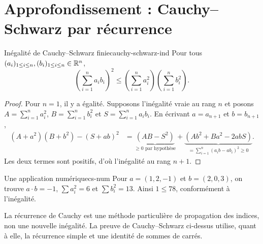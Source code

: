 \section{Approfondissement : Cauchy--Schwarz par récurrence}
\begin{theoreme}{Inégalité de Cauchy--Schwarz finie}{cauchy-schwarz-ind}
Pour tous $(a_i)_{1\le i\le n},(b_i)_{1\le i\le n}\in\mathbb R^n$,
\[
 \left(\sum_{i=1}^n a_ib_i\right)^2\le
 \left(\sum_{i=1}^n a_i^2\right)
 \left(\sum_{i=1}^n b_i^2\right).
\]
\end{theoreme}
\begin{proof}
Pour $n=1$, il y a égalité. Supposons l'inégalité vraie au rang $n$
et posons $A=\sum_{i=1}^n a_i^2$, $B=\sum_{i=1}^n b_i^2$ et
$S=\sum_{i=1}^n a_ib_i$. En écrivant $a=a_{n+1}$ et $b=b_{n+1}$,
\[
\begin{aligned}
 (A+a^2)(B+b^2)-(S+ab)^2
 &=\underbrace{(AB-S^2)}_{\ge0\text{ par hypothèse}}+
   \underbrace{(Ab^2+Ba^2-2abS)}_{=\sum_{i=1}^n(a_i b-a b_i)^2\ge0}.
\end{aligned}
\]
Les deux termes sont positifs, d'où l'inégalité au rang $n+1$.
\end{proof}
\begin{exemple}{Une application numérique}{cs-num}
Pour $a=(1,2,-1)$ et $b=(2,0,3)$, on trouve $a\cdot b=-1$,
$\sum a_i^2=6$ et $\sum b_i^2=13$. Ainsi $1\le 78$, conformément à l'inégalité.
\end{exemple}
\begin{retenir}
La récurrence de Cauchy est une méthode particulière de propagation des indices,
non une nouvelle inégalité. La preuve de Cauchy--Schwarz ci-dessus utilise, quant à elle,
la récurrence simple et une identité de sommes de carrés.
\end{retenir}


